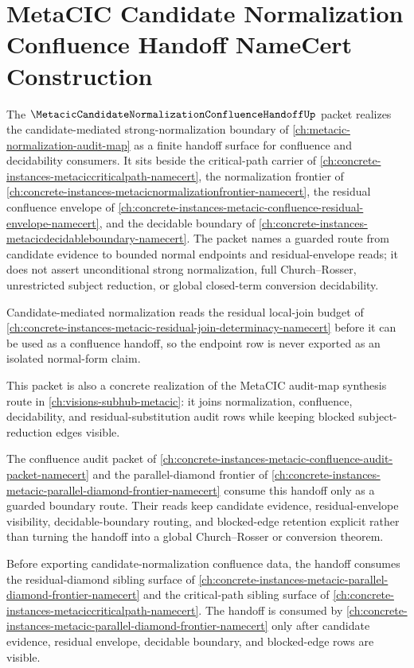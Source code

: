 \chapter{MetaCIC Candidate Normalization Confluence Handoff NameCert Construction}
\label{ch:concrete-instances-metacic-candidate-normalization-confluence-handoff-namecert}

The $\MetacicCandidateNormalizationConfluenceHandoffUp$ packet realizes the candidate-mediated strong-normalization boundary of \autoref{ch:metacic-normalization-audit-map} as a finite handoff surface for confluence and decidability consumers. It sits beside the critical-path carrier of \autoref{ch:concrete-instances-metaciccriticalpath-namecert}, the normalization frontier of \autoref{ch:concrete-instances-metacicnormalizationfrontier-namecert}, the residual confluence envelope of \autoref{ch:concrete-instances-metacic-confluence-residual-envelope-namecert}, and the decidable boundary of \autoref{ch:concrete-instances-metacicdecidableboundary-namecert}. The packet names a guarded route from candidate evidence to bounded normal endpoints and residual-envelope reads; it does not assert unconditional strong normalization, full Church--Rosser, unrestricted subject reduction, or global closed-term conversion decidability.

Candidate-mediated normalization reads the residual local-join budget of \autoref{ch:concrete-instances-metacic-residual-join-determinacy-namecert} before it can be used as a confluence handoff, so the endpoint row is never exported as an isolated normal-form claim.

This packet is also a concrete realization of the MetaCIC audit-map synthesis route in \autoref{ch:visions-subhub-metacic}: it joins normalization, confluence, decidability, and residual-substitution audit rows while keeping blocked subject-reduction edges visible.

The confluence audit packet of \autoref{ch:concrete-instances-metacic-confluence-audit-packet-namecert} and the parallel-diamond frontier of \autoref{ch:concrete-instances-metacic-parallel-diamond-frontier-namecert} consume this handoff only as a guarded boundary route. Their reads keep candidate evidence, residual-envelope visibility, decidable-boundary routing, and blocked-edge retention explicit rather than turning the handoff into a global Church--Rosser or conversion theorem.

Before exporting candidate-normalization confluence data, the handoff consumes the residual-diamond sibling surface of \autoref{ch:concrete-instances-metacic-parallel-diamond-frontier-namecert} and the critical-path sibling surface of \autoref{ch:concrete-instances-metaciccriticalpath-namecert}. The handoff is consumed by \autoref{ch:concrete-instances-metacic-parallel-diamond-frontier-namecert} only after candidate evidence, residual envelope, decidable boundary, and blocked-edge rows are visible.

